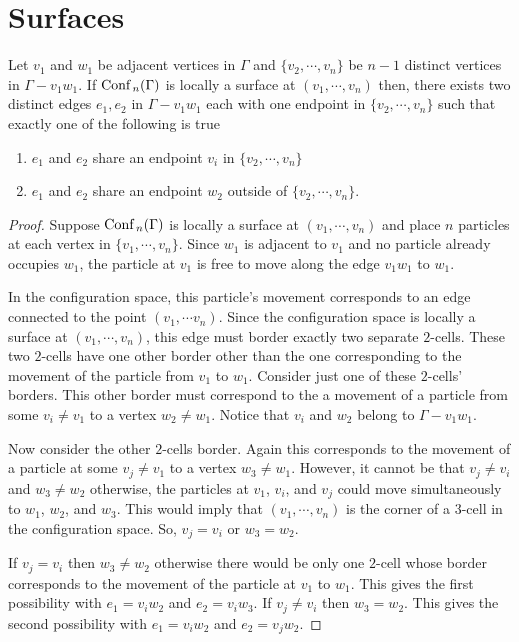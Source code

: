 \chapter{Surfaces}

\begin{lem}\label{lem:is_surface_1}
    Let \(v_1\) and \(w_1\) be adjacent vertices in \(\Gamma\) and \(\{v_2, \cdots, v_n\}\) be \(n-1\) distinct vertices
    in \(\Gamma - v_1 w_1\).
    If \(\text{Conf}\,_n(\Gamma)\) is locally a surface at \((v_1, \cdots, v_n)\) then,
    there exists two distinct edges \(e_1, e_2\) in \(\Gamma - v_1 w_1\) 
    each with one endpoint in \(\{v_2,\cdots, v_n\}\)
    such that exactly one of the following is true 
    \begin{enumerate}
        \item \(e_1\) and \(e_2\) share an endpoint \(v_i\) in \(\{v_2, \cdots, v_n\}\)
        \item \(e_1\) and \(e_2\) share an endpoint \(w_2\) outside of \(\{v_2, \cdots, v_n\}\).
    \end{enumerate}
\end{lem}
\begin{proof}
    Suppose \(\text{Conf}\,_n(\Gamma)\) is locally a surface at \((v_1, \cdots, v_n)\)
    and place \(n\) particles at each vertex in \(\{v_1, \cdots, v_n\}\).
    Since \(w_1\) is adjacent to \(v_1\) and no particle already occupies
    \(w_1\), the particle at \(v_1\) is free to move along the edge \(v_1 w_1\)
    to \(w_1\).
    
    In the configuration space, this particle's movement corresponds to an edge
    connected to the point \((v_1, \cdots v_n)\).  Since the configuration space
    is locally a surface at \((v_1, \cdots, v_n)\), this edge must border exactly
    two separate \(2\)-cells.  %
    These two \(2\)-cells have one other border other
    than the one corresponding to the movement of the particle from \(v_1\) to
    \(w_1\).  Consider just one of these \(2\)-cells' borders. This other border
    must correspond to the a movement of a particle from some \(v_i \neq v_1\)
    to a vertex \(w_2 \neq w_1\). Notice that \(v_i\) and \(w_2\) belong to
    \(\Gamma - v_1 w_1\).
    
    Now consider the other \(2\)-cells border. Again this corresponds to the
    movement of a particle at some \(v_j \neq v_1\) to a vertex \(w_3 \neq
    w_1\).  However, it cannot be that \(v_j \neq v_i\) and \(w_3 \neq w_2\)
    otherwise, the particles at \(v_1\), \(v_i\), and \(v_j\) could move
    simultaneously to \(w_1\), \(w_2\), and \(w_3\). This would imply that
    \((v_1, \cdots, v_n)\) is the corner of a \(3\)-cell in the configuration
    space. So, \(v_j = v_i\) or \(w_3 = w_2\).
    
    If \(v_j = v_i\) then \(w_3 \neq w_2\) otherwise there would be only one
    \(2\)-cell whose border corresponds to the movement of the particle at
    \(v_1\) to \(w_1\).  This gives the first possibility with \(e_1 = v_i w_2\) and \(e_2 = v_i w_3\).
    If \(v_j \neq v_i\) then \(w_3 = w_2\). This gives the second possibility with \(e_1 = v_i w_2\) and \(e_2 = v_j w_2\).
\end{proof}


